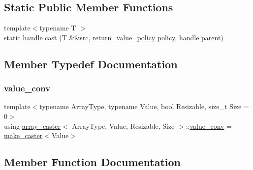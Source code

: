 \subsection*{Static Public Member Functions}
\begin{DoxyCompactItemize}
\item 
{\footnotesize template$<$typename T $>$ }\\static \mbox{\hyperlink{classhandle}{handle}} \mbox{\hyperlink{structarray__caster_a5eac243c7f9bca8dbe58fc914e93a2a0}{cast}} (T \&\&\mbox{\hyperlink{_s_d_l__opengl__glext_8h_a72e0fdf0f845ded60b1fada9e9195cd7}{src}}, \mbox{\hyperlink{detail_2common_8h_adde72ab1fb0dd4b48a5232c349a53841}{return\+\_\+value\+\_\+policy}} policy, \mbox{\hyperlink{classhandle}{handle}} parent)
\end{DoxyCompactItemize}


\subsection{Member Typedef Documentation}
\mbox{\label{structarray__caster_a9614e5ea042dadbc2f12c067d6bd27f2}} 
\subsubsection{\texorpdfstring{value\_conv}{value\_conv}}
{\footnotesize\ttfamily template$<$typename Array\+Type, typename Value, bool Resizable, size\+\_\+t Size = 0$>$ \\
using \mbox{\hyperlink{structarray__caster}{array\+\_\+caster}}$<$ Array\+Type, Value, Resizable, Size $>$\+::\mbox{\hyperlink{structarray__caster_a9614e5ea042dadbc2f12c067d6bd27f2}{value\+\_\+conv}} =  \mbox{\hyperlink{cast_8h_ab32b52411a6b07420516d79074815713}{make\+\_\+caster}}$<$Value$>$}



\subsection{Member Function Documentation}
\mbox{\label{structarray__caster_a5eac243c7f9bca8dbe58fc914e93a2a0}} 
